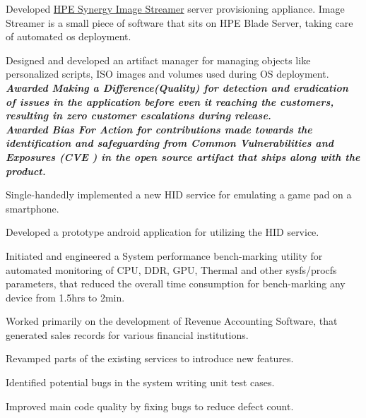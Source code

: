 \documentclass[]{kushal-resume}
\begin{document}
\begin{minipage}[t]{0.66\textwidth}
\begin{tightemize}
\item Developed \href{https://buy.hpe.com/us/en/synergy/synergy-management/synergy-image-streamer/synergy-image-streamer/hpe-synergy-image-streamer/p/1008615214}{HPE Synergy Image Streamer} server provisioning appliance.
Image Streamer is a small piece of software that sits on HPE Blade Server, taking care of automated os deployment.
\item Designed and developed an artifact manager for managing objects like personalized scripts, ISO images and volumes used during OS deployment. \\
	    {\footnotesize \textit{\textbf{Awarded Making a Difference(Quality) for detection and eradication of issues in the application before even it reaching the customers, resulting in zero customer escalations during release. }}} \\
	    {\footnotesize \textit{\textbf{Awarded Bias For Action for contributions made towards the identification and safeguarding from Common Vulnerabilities and Exposures (CVE ) in the open source artifact that ships along with the product. }}}  \\
\end{tightemize}
\sectionsep

\begin{tightemize}
\item Single-handedly implemented a new HID  service for emulating a game pad on a smartphone.
\item Developed a prototype android application for utilizing the HID service.
\item Initiated and engineered a System performance bench-marking utility for automated monitoring of CPU, DDR, GPU, Thermal and other sysfs/procfs parameters, that reduced the overall time consumption for bench-marking any device from 1.5hrs to 2min.
\end{tightemize}
\sectionsep

\begin{tightemize}
\item Worked primarily on the development of Revenue Accounting Software, that generated
 sales records for various financial institutions.
 \item Revamped parts of the existing services to introduce new features. 
 \item Identified potential bugs in the system writing unit test cases.
 \item Improved main code quality by fixing bugs to reduce defect count.
\end{tightemize}
\sectionsep


\end{minipage} 
\end{document}
